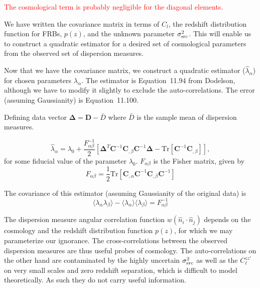 \documentclass[onecolumn,prd,noshowpacs,nofootinbib,amsmath,amssymb]{revtex4}
\newcommand{\bD}{\boldsymbol D}
\newcommand{\bC}{\boldsymbol C}
\newcommand{\bDelta}{\boldsymbol \Delta}
\newcommand{\red}{\textcolor{red}}
\begin{document}
\red{The cosmological term is probably negligible for the diagonal elements.}

We have written the covariance matrix in terms of $C_l$, the
redshift distribution function for FRBs, $p(z)$, and the unknown parameter
$\sigma^2_{\rm src}$.  This will enable us to construct a quadratic estimator
for a desired set of cosmological parameters from the observed set of
dispersion measures.

Now that we have the covariance matrix, we construct a quadratic estimator
($\hat{\lambda}_\alpha$) for
chosen parameters $\lambda_\alpha$. The estimator is Equation~11.94 from
Dodelson, although we have to modify it slightly to exclude the
auto-correlations.  The error (assuming Gaussianity) is Equation~11.100.

Defining data vector $\bDelta = \bD - \bar{D}$ where $\bar{D}$ is the sample
mean of dispersion measures.

\begin{equation}
    \label{e:est_dod}
    \hat{\lambda}_\alpha = \lambda_0
        + \frac{F^{-1}_{\alpha\beta}}{2} 
        \left[ \bDelta^T \bC^{-1} \bC_{,\beta} \bC^{-1} \bDelta
        - \mathrm{Tr}\left[\bC^{-1} \bC_{,\beta}\right] \right],
\end{equation}
for some fiducial value of the parameter $\lambda_0$.  $F_{\alpha\beta}$ is the
Fisher matrix, given by
\begin{equation}
    F_{\alpha \beta} = \frac{1}{2} \mathrm{Tr} 
        \left[ \bC_{,\alpha} \bC^{-1} \bC_{,\beta} \bC^{-1} \right]
\end{equation}

The covariance of this estimator (assuming Gaussianity of the original
data) is
\begin{equation}
    \langle \lambda_\alpha \lambda_\beta \rangle
        - \langle \lambda_\alpha \rangle \langle \lambda_\beta \rangle
        = F^{-1}_{\alpha\beta}
\end{equation}

The dispersion measure angular correlation function 
$w(\hat{n}_i\cdot\hat{n}_j)$ depends on the cosmology
and the redshift distribution function $p(z)$, for which we may parameterize
our ignorance. The
cross-correlations between the observed dispersion measures are thus useful
probes of cosmology.  The auto-correlations on the other hand are contaminated
by the highly uncertain $\sigma^2_{\rm src}$ as well as the $C^{zz'}_\ell$ on
very small scales and zero redshift separation, which is difficult to model
theoretically.  As such they do not carry useful information.
\end{document}
